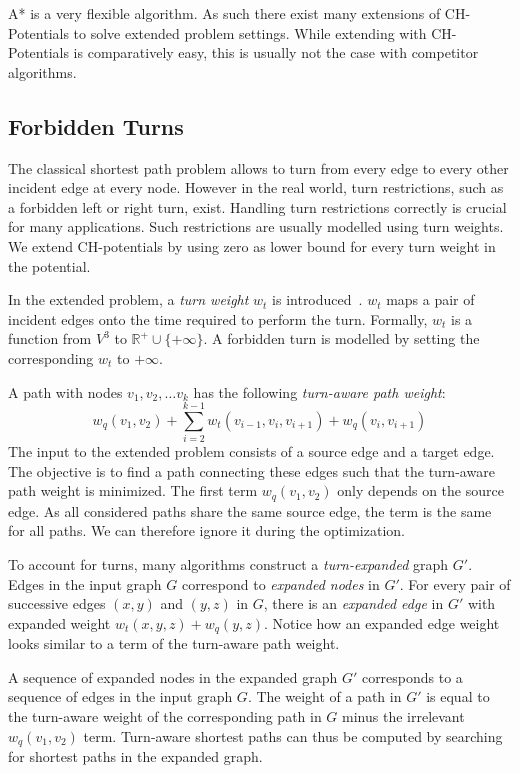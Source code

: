 \documentclass[sigconf]{acmart}
\begin{document}
A* is a very flexible algorithm. 
As such there exist many extensions of CH-Potentials to solve extended problem settings.
While extending with CH-Potentials is comparatively easy, this is usually not the case with competitor algorithms.

\subsection{Forbidden Turns}

The classical shortest path problem allows to turn from every edge to every other incident edge at every node.
However in the real world, turn restrictions, such as a forbidden left or right turn, exist.
Handling turn restrictions correctly is crucial for many applications.
Such restrictions are usually modelled using turn weights.
We extend CH-potentials by using zero as lower bound for every turn weight in the potential.

In the extended problem, a \emph{turn weight} $w_t$ is introduced~\cite{related-turn-litrature,see-geisberger-turn-table-paper}.
$w_t$ maps a pair of incident edges onto the time required to perform the turn.
Formally, $w_t$ is a function from $V^3$ to $\mathbb{R}^+ \cup\{+\infty\}$.
A forbidden turn is modelled by setting the corresponding $w_t$ to $+\infty$.

A path with nodes $v_1, v_2,\ldots v_k$ has the following \emph{turn-aware path weight}:\[
w_q(v_1, v_2) + \sum_{i=2}^{k-1}  w_t(v_{i-1},v_i,v_{i+1})  + w_q(v_i,v_{i+1}) 
\] The input to the extended problem consists of a source edge and a target edge.
The objective is to find a path connecting these edges such that the turn-aware path weight is minimized.
The first term $w_q(v_1, v_2)$ only depends on the source edge.
As all considered paths share the same source edge, the term is the same for all paths.
We can therefore ignore it during the optimization.

To account for turns, many algorithms construct a \emph{turn-expanded} graph $G'$.
Edges in the input graph $G$ correspond to \emph{expanded nodes} in $G'$. 
For every pair of successive edges $(x,y)$ and $(y,z)$ in $G$, there is an \emph{expanded edge} in $G'$ with expanded weight $w_t(x,y,z) + w_q(y,z)$.
Notice how an expanded edge weight looks similar to a term of the turn-aware path weight.

A sequence of expanded nodes in the expanded graph $G'$ corresponds to a sequence of edges in the input graph $G$.
The weight of a path in $G'$ is equal to the turn-aware weight of the corresponding path in $G$ minus the irrelevant $w_q(v_1,v_2)$ term.
Turn-aware shortest paths can thus be computed by searching for shortest paths in the expanded graph.
\end{document}
